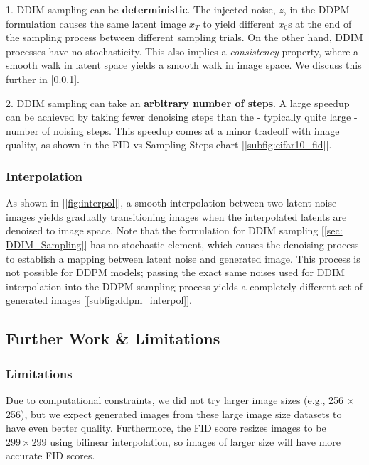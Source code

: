 \documentclass[10pt,twocolumn,letterpaper]{article}
\begin{document}
1. DDIM sampling can be \textbf{deterministic}. The injected noise, $z$, in the DDPM formulation causes the same latent image $x_T$ to yield different $x_0$s at the end of the sampling process between different sampling trials. On the other hand, DDIM processes have no stochasticity. This also implies a \textit{consistency} property, where a smooth walk in latent space yields a smooth walk in image space. We discuss this further in [\ref{sec:interpolation}].

2. DDIM sampling can take an \textbf{arbitrary number of steps}. A large speedup can be achieved by taking fewer denoising steps than the - typically quite large - number of noising steps. This speedup comes at a minor tradeoff with image quality, as shown in the FID vs Sampling Steps chart [\ref{subfig:cifar10_fid}].

\subsubsection{Interpolation} \label{sec:interpolation}
As shown in [\ref{fig:interpol}], a smooth interpolation between two latent noise images yields gradually transitioning images when the interpolated latents are denoised to image space. Note that the formulation for DDIM sampling [\ref{sec: DDIM_Sampling}] has no stochastic element, which causes the denoising process to establish a mapping between latent noise and generated image. This process is not possible for DDPM models; passing the exact same noises used for DDIM interpolation into the DDPM sampling process yields a completely different set of generated images [\ref{subfig:ddpm_interpol}].

\subsection{Further Work \& Limitations}
\subsubsection{Limitations}
Due to computational constraints, we did not try larger image sizes (e.g., 256 $\times$ 256), but we expect generated images from these large image size datasets to have even better quality. Furthermore, the FID score resizes images to be $299 \times 299$ using bilinear interpolation, so images of larger size will have more accurate FID scores.
\end{document}
